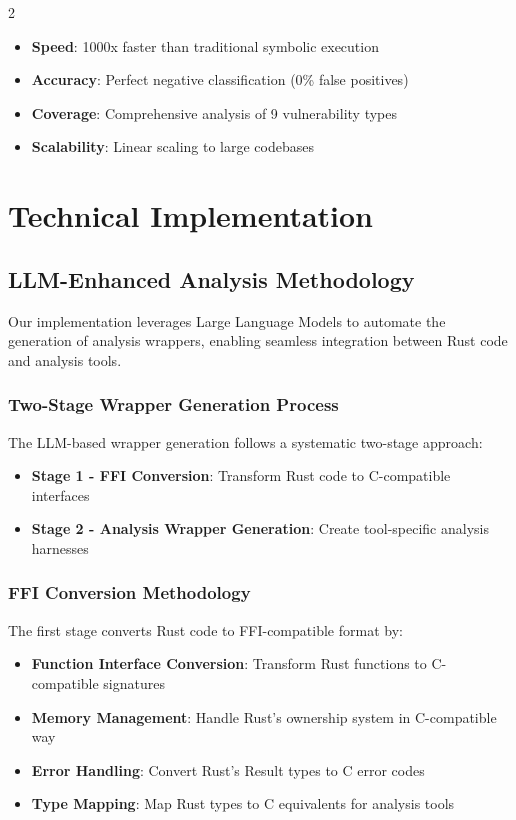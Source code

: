 \documentclass[12pt,a4paper]{article}
\begin{document}
\begin{multicols}{2}
\begin{itemize}
    \item \textbf{Speed}: 1000x faster than traditional symbolic execution
    \item \textbf{Accuracy}: Perfect negative classification (0\% false positives)
    \item \textbf{Coverage}: Comprehensive analysis of 9 vulnerability types
    \item \textbf{Scalability}: Linear scaling to large codebases
\end{itemize}

\section{Technical Implementation}

\subsection{LLM-Enhanced Analysis Methodology}

Our implementation leverages Large Language Models to automate the generation of analysis wrappers, enabling seamless integration between Rust code and analysis tools.

\subsubsection{Two-Stage Wrapper Generation Process}

The LLM-based wrapper generation follows a systematic two-stage approach:

\begin{itemize}
    \item \textbf{Stage 1 - FFI Conversion}: Transform Rust code to C-compatible interfaces
    \item \textbf{Stage 2 - Analysis Wrapper Generation}: Create tool-specific analysis harnesses
\end{itemize}

\subsubsection{FFI Conversion Methodology}

The first stage converts Rust code to FFI-compatible format by:

\begin{itemize}
    \item \textbf{Function Interface Conversion}: Transform Rust functions to C-compatible signatures
    \item \textbf{Memory Management}: Handle Rust's ownership system in C-compatible way
    \item \textbf{Error Handling}: Convert Rust's Result types to C error codes
    \item \textbf{Type Mapping}: Map Rust types to C equivalents for analysis tools
\end{itemize}


\end{multicols}
\end{document}
